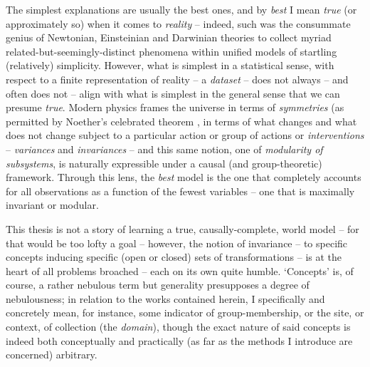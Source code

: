 The simplest explanations are usually the best ones, and by \emph{best} I mean \emph{true} (or
approximately so) when it comes to \emph{reality} -- indeed, such was the consummate genius of
Newtonian, Einsteinian and Darwinian theories to collect myriad related-but-seemingly-distinct
phenomena within unified models of startling (relatively) simplicity.
%
However, what is simplest in a statistical sense, with respect to a finite representation of
reality -- a \emph{dataset} -- does not always -- and often does not -- align with what is simplest
in the general sense that we can presume \emph{true}.
%
Modern physics frames the universe in terms of \emph{symmetries} (as permitted by Noether's
celebrated theorem \citep{noether1918invariante}, in terms of what changes and what does not change
subject to a particular action or group of actions or \emph{interventions} -- \emph{variances} and
\emph{invariances} -- and this same notion, one of \emph{modularity of subsystems}, is naturally
expressible under a causal (and group-theoretic) framework.
%
Through this lens, the \emph{best} model is the one that completely accounts for all observations
as a function of the fewest variables -- one that is maximally invariant or modular.

%
This thesis is not a story of learning a true, causally-complete, world model -- for that would be
too lofty a goal -- however, the notion of invariance -- to specific concepts inducing specific
(open or closed) sets of transformations -- is at the heart of all problems broached -- each on
its own quite humble.
%
`Concepts' is, of course, a rather nebulous term but generality presupposes a degree of
nebulousness; in relation to the works contained herein, I specifically and concretely mean, for
instance, some indicator of group-membership, or the site, or context, of collection (the
\emph{domain}), though the exact nature of said concepts is indeed both conceptually and
practically (as far as the methods I introduce are concerned) arbitrary.
%

